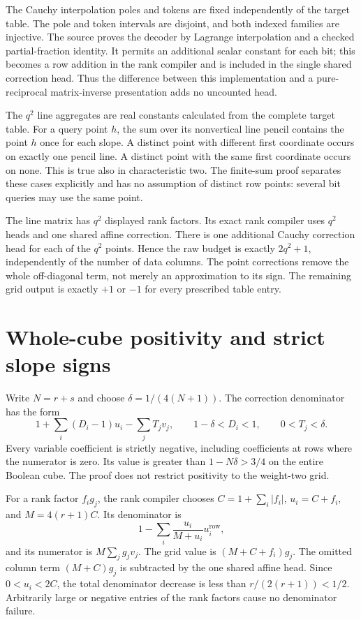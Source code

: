 \documentclass[11pt]{article}
\begin{document}
The Cauchy interpolation poles and tokens are fixed independently of the
target table. The pole and token intervals are disjoint, and both indexed
families are injective. The source proves the decoder by Lagrange
interpolation and a checked partial-fraction identity. It permits an
additional scalar constant for each bit; this becomes a row addition in
the rank compiler and is included in the single shared correction head.
Thus the difference between this implementation and a pure-reciprocal
matrix-inverse presentation adds no uncounted head.

The $q^2$ line aggregates are real constants calculated from the complete
target table. For a query point $h$, the sum over its nonvertical line
pencil contains the point $h$ once for each slope. A distinct point with
different first coordinate occurs on exactly one pencil line. A distinct
point with the same first coordinate occurs on none. This is true also
in characteristic two. The finite-sum proof separates these cases
explicitly and has no assumption of distinct row points: several bit
queries may use the same point.

The line matrix has $q^2$ displayed rank factors. Its exact rank compiler
uses $q^2$ heads and one shared affine correction. There is one additional
Cauchy correction head for each of the $q^2$ points. Hence the raw budget
is exactly $2q^2+1$, independently of the number of data columns. The
point corrections remove the whole off-diagonal term, not merely an
approximation to its sign. The remaining grid output is exactly $+1$ or
$-1$ for every prescribed table entry.

\section{Whole-cube positivity and strict slope signs}
Write $N=r+s$ and choose $\delta=1/(4(N+1))$. The correction denominator
has the form
\[
 1+\sum_i(D_i-1)u_i-\sum_jT_jv_j,
 \qquad 1-\delta<D_i<1,
 \qquad 0<T_j<\delta.
\]
Every variable coefficient is strictly negative, including coefficients
at rows where the numerator is zero. Its value is greater than
$1-N\delta>3/4$ on the entire Boolean cube. The proof does not restrict
positivity to the weight-two grid.

For a rank factor $f_i g_j$, the rank compiler chooses
$C=1+\sum_i|f_i|$, $u_i=C+f_i$, and $M=4(r+1)C$. Its denominator is
\[
 1-\sum_i\frac{u_i}{M+u_i}u_i^{\mathrm{row}},
\]
and its numerator is $M\sum_jg_jv_j$. The grid value is
$(M+C+f_i)g_j$. The omitted column term $(M+C)g_j$ is subtracted by
the one shared affine head. Since $0<u_i<2C$, the total denominator
decrease is less than $r/(2(r+1))<1/2$. Arbitrarily large or negative
entries of the rank factors cause no denominator failure.
\end{document}
